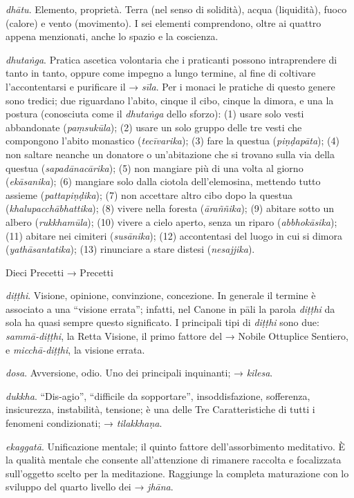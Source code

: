 \emph{dhātu}. Elemento, proprietà. Terra (nel senso di solidità), acqua
(liquidità), fuoco (calore) e vento (movimento). I sei elementi
comprendono, oltre ai quattro appena menzionati, anche lo spazio e la
coscienza.

\emph{dhutaṅga}. Pratica ascetica volontaria che i praticanti possono
intraprendere di tanto in tanto, oppure come impegno a lungo termine, al
fine di coltivare l'accontentarsi e purificare il → \emph{sīla}. Per i
monaci le pratiche di questo genere sono tredici; due riguardano
l'abito, cinque il cibo, cinque la dimora, e una la postura (conosciuta
come il \emph{dhutaṅga} dello sforzo): (1) usare solo vesti abbandonate
(\emph{paṃsukūla}); (2) usare un solo gruppo delle tre vesti
che compongono l'abito monastico (\emph{tecīvarika}); (3) fare la
questua (\emph{piṇḍapāta}); (4) non saltare neanche un donatore
o un'abitazione che si trovano sulla via della questua
(\emph{sapadānacārika}); (5) non mangiare più di una volta al giorno
(\emph{ekāsanika}); (6) mangiare solo dalla ciotola dell'elemosina,
mettendo tutto assieme (\emph{pattapiṇḍika}); (7) non accettare altro
cibo dopo la questua (\emph{khalupacchābhattika}); (8) vivere nella
foresta (\emph{āraññika}); (9) abitare sotto un albero
(\emph{rukkhamūla}); (10) vivere a cielo aperto, senza un riparo
(\emph{abbhokāsika}); (11) abitare nei cimiteri (\emph{susānika}); (12)
accontentasi del luogo in cui si dimora (\emph{yathāsantatika}); (13)
rinunciare a stare distesi (\emph{nesajjika}).

Dieci Precetti → Precetti

\emph{diṭṭhi}. Visione, opinione, convinzione, concezione. In generale
il termine è associato a una ``visione errata''; infatti, nel Canone in
pāli la parola \emph{diṭṭhi} da sola ha quasi sempre questo significato.
I principali tipi di \emph{diṭṭhi} sono due: \emph{sammā-diṭṭhi}, la
Retta Visione, il primo fattore del → Nobile Ottuplice Sentiero, e
\emph{micchā-diṭṭhi}, la visione errata.

\emph{dosa}. Avversione, odio. Uno dei principali inquinanti; →
\emph{kilesa}.

\emph{dukkha}. ``Dis-agio'', ``difficile da sopportare'',
insoddisfazione, sofferenza, insicurezza, instabilità, tensione; è una
delle Tre Caratteristiche di tutti i fenomeni condizionati; →
\emph{tilakkhaṇa}.

\emph{ekaggatā}. Unificazione mentale; il quinto fattore
dell'assorbimento meditativo. È la qualità mentale che consente
all'attenzione di rimanere raccolta e focalizzata sull'oggetto scelto
per la meditazione. Raggiunge la completa maturazione con lo sviluppo
del quarto livello dei → \emph{jhāna}.

